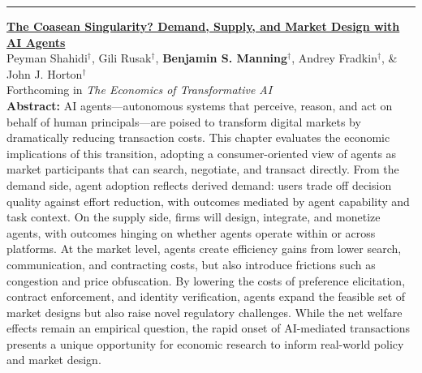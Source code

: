 \documentclass[11pt]{article}
\newenvironment{publist}
  {\begin{list}{}{%
    \setlength{\leftmargin}{1.5em}%
    \setlength{\itemindent}{-1.5em}%
    \setlength{\itemsep}{10pt}%
    \setlength{\parsep}{0pt}%
    \setlength{\topsep}{4pt}}}
  {\end{list}}
\newcommand{\pubsection}[1]{\Needspace*{6\baselineskip}\vspace{6pt}{\large\scshape #1}\par\vspace{-4pt}\rule{\textwidth}{0.4pt}}
\begin{document}
\pubsection{Book Chapters}
\begin{publist}
\item \href{https://www.nber.org/books-and-chapters/economics-transformative-ai/coasean-singularity-demand-supply-and-market-design-ai-agents}{\textbf{The Coasean Singularity? Demand, Supply, and Market Design with AI Agents}}\\
Peyman Shahidi$^\dagger$, Gili Rusak$^\dagger$, \textbf{Benjamin S. Manning}$^\dagger$, Andrey Fradkin$^\dagger$, \& John J. Horton$^\dagger$\\
Forthcoming in \textit{The Economics of Transformative AI}\\[3pt]
{\footnotesize \textbf{Abstract: }AI agents---autonomous systems that perceive, reason, and act on behalf of human principals---are poised to transform digital markets by dramatically reducing transaction costs. This chapter evaluates the economic implications of this transition, adopting a consumer-oriented view of agents as market participants that can search, negotiate, and transact directly. From the demand side, agent adoption reflects derived demand: users trade off decision quality against effort reduction, with outcomes mediated by agent capability and task context. On the supply side, firms will design, integrate, and monetize agents, with outcomes hinging on whether agents operate within or across platforms. At the market level, agents create efficiency gains from lower search, communication, and contracting costs, but also introduce frictions such as congestion and price obfuscation. By lowering the costs of preference elicitation, contract enforcement, and identity verification, agents expand the feasible set of market designs but also raise novel regulatory challenges. While the net welfare effects remain an empirical question, the rapid onset of AI-mediated transactions presents a unique opportunity for economic research to inform real-world policy and market design.}
\end{publist}
\end{document}

